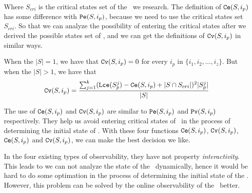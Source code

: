 Where $S_{cri}$ is the critical states set of the \BCN\ we research. The definition of ${\tt Ce}(S, i_p)$ has some difference with ${\tt Pe}(S, i_p)$, because we need to use the critical states set $S_{cri}$. So that  we can analyze the possibility of entering the  critical states after we derived the possible states set of \BCNs, and we can get the definitions of $\Cv(S, i_p)$ in similar ways. %

\begin{definition}[$\Cv(S, i_p)$] 
When the $|S|=1$, we have that
${\tt Cv}(S, i_p)=0$  for every $i_p$ in $\{i_1,i_2,\ldots, i_z\}$. But when the $|S|>1$, 
we have that  
\[{\tt Cv}(S, i_p)=\frac{\sum_{j=1}^k ({\tt Lce}(S_p^j)-{\tt Ce}(S, i_p)+|S \cap S_{cri}|)^2 |S_p^j|}{ |S|}\] 
\end{definition}

The use of ${\tt Ce}(S, i_p)$ and $\Cv(S, i_p)$ are similar to ${\tt Pe}(S, i_p)$ and ${\tt Pv}(S, i_p)$ respectively. They help us avoid entering critical states of \BCNs\ in the process of determining the initial state of \BCNs. With these four functions ${\tt Ce}(S, i_p)$, $\Cv(S, i_p)$, ${\tt Ce}(S, i_p)$ and $\Cv(S, i_p)$, we can make the best decision we like. 

In the four existing types of observability, they have not property {\em interactivity}. This leads to we can not analyze the state of the \BCNs\ dynamically, hence it would be hard to do some optimation in the process of determining the initial state of the \BCNs. However, this problem can be solved by the online observability of the \BCNs\ better.